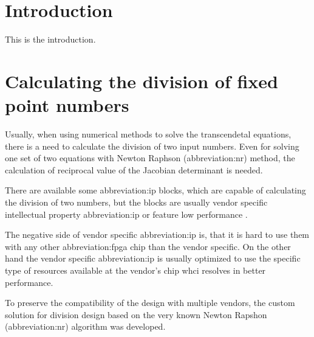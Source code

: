 \documentclass[a4paper, twoside, 11pt]{article}
\begin{document}


\tableofcontents
\newpage%
\flushbottom %
\newpage
\vspace{0pt}
\listoffigures %
\flushbottom %
\newpage
\listoftables
\flushbottom
\newpage


\null\newpage
\setcounter{page}{1}

\section{Introduction}
This is the introduction.

\flushbottom %
\newpage

\section{Calculating the division of fixed point numbers}
Usually, when using numerical methods to solve the transcendetal equations, there is a need to calculate the division of two input numbers. Even for solving one set of two equations with Newton Raphson (\gls{abbreviation:nr}) method, the calculation of reciprocal value of the Jacobian determinant is needed.\par
There are available some \gls{abbreviation:ip} blocks, which are capable of calculating the division of two numbers, but the blocks are usually vendor specific intellectual property \gls{abbreviation:ip} \cite{amd-xilinx-vivado-divider-ip-block} or feature low performance \cite{burke-fixed-point-math-library}.\par
The negative side of vendor specific \gls{abbreviation:ip} is, that it is hard to use them with any other \gls{abbreviation:fpga} chip than the vendor specific. On the other hand the vendor specific \gls{abbreviation:ip} is usually optimized to use the specific type of resources available at the vendor's chip whci resolves in better performance.\par
To preserve the compatibility of the design with multiple vendors, the custom solution for division design based on the very known Newton Rapshon (\gls{abbreviation:nr}) algorithm was developed. \cite{burke-fixed-point-math-library}
\end{document}

